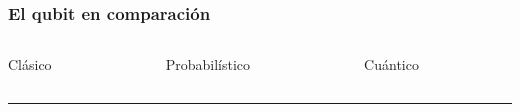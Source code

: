 \documentclass{beamer}
\begin{document}
\begin{frame}[t]
\frametitle{El qubit en comparación}

\begin{columns}
	\centering
	\begin{column}{0.33\textwidth}
		\centering
		Clásico
	\end{column}
	\begin{column}{0.33\textwidth}
		\centering
		Probabilístico
	\end{column}
	\begin{column}{0.33\textwidth}
		\centering
		Cuántico
	\end{column}
\end{columns}


\begin{columns}[c]
	\centering
	\begin{column}{0.33\textwidth}
		\centering
		
	\end{column}
	\vrule{}
	\begin{column}{0.33\textwidth}
		\centering
		
	\end{column}
	\vrule{}
	\begin{column}{0.33\textwidth}
		\centering
		
	\end{column}
\end{columns}

\hrule{}



\end{frame}
\end{document}

